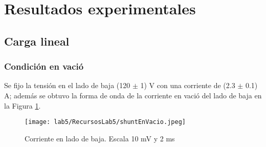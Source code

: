 \documentclass[11pt,letterpaper]{article}     %
\begin{document}
\section{Resultados experimentales}
\subsection{Carga lineal}
\subsubsection{Condición en vació}
Se fijo la tensión en el lado de baja (120 $\pm$ 1) V con una corriente de (2.3 $\pm$ 0.1) A; además se obtuvo la forma de onda de la corriente en vació del lado de baja en la Figura \ref{ShuntEnVacio}.
\begin{figure}[H]
    \centering
    \texttt{[image: lab5/RecursosLab5/shuntEnVacio.jpeg]}
    \caption{Corriente en lado de baja. Escala 10 mV y 2 ms }
    \label{ShuntEnVacio}
\end{figure}
\end{document}
